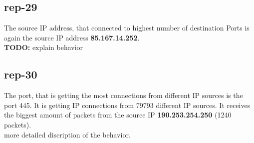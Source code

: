 \subsection*{rep-29}
The source IP address, that connected to highest number of destination Ports is again the source IP address \textbf{85.167.14.252}. \\

\textbf{TODO:} explain behavior

\subsection*{rep-30}
The port, that is getting the most connections from different IP sources is the port 445. It is getting IP connections from 79793 different IP sources. It receives the biggest amount of packets from the source IP \textbf{190.253.254.250} (1240 packets). \\

 more detailed discription of the behavior.
